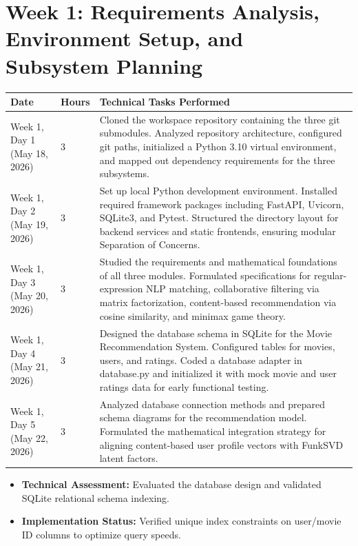 \documentclass[11pt,a4paper]{article}
\begin{document}
\section*{Week 1: Requirements Analysis, Environment Setup, and Subsystem Planning}
\begin{longtable}{L{2.8cm} C{1.2cm} L{10.5cm}}
    \toprule
    \textbf{Date} & \textbf{Hours} & \textbf{Technical Tasks Performed} \\
    \midrule
    \endhead
    \bottomrule
    \endfoot
    \bottomrule
    \endlastfoot
    Week 1, Day 1 \newline (May 18, 2026) & 3 & Cloned the workspace repository containing the three git submodules. Analyzed repository architecture, configured git paths, initialized a Python 3.10 virtual environment, and mapped out dependency requirements for the three subsystems. \\
    \addlinespace
    Week 1, Day 2 \newline (May 19, 2026) & 3 & Set up local Python development environment. Installed required framework packages including FastAPI, Uvicorn, SQLite3, and Pytest. Structured the directory layout for backend services and static frontends, ensuring modular Separation of Concerns. \\
    \addlinespace
    Week 1, Day 3 \newline (May 20, 2026) & 3 & Studied the requirements and mathematical foundations of all three modules. Formulated specifications for regular-expression NLP matching, collaborative filtering via matrix factorization, content-based recommendation via cosine similarity, and minimax game theory. \\
    \addlinespace
    Week 1, Day 4 \newline (May 21, 2026) & 3 & Designed the database schema in SQLite for the Movie Recommendation System. Configured tables for movies, users, and ratings. Coded a database adapter in database.py and initialized it with mock movie and user ratings data for early functional testing. \\
    \addlinespace
    Week 1, Day 5 \newline (May 22, 2026) & 3 & Analyzed database connection methods and prepared schema diagrams for the recommendation model. Formulated the mathematical integration strategy for aligning content-based user profile vectors with FunkSVD latent factors. \\
\end{longtable}

\begin{tcolorbox}[colback=gray!5!white,colframe=gray!60!black,title=Weekly Review (Week 1)]
    \begin{itemize}
        \item \textbf{Technical Assessment:} Evaluated the database design and validated SQLite relational schema indexing.
        \item \textbf{Implementation Status:} Verified unique index constraints on user/movie ID columns to optimize query speeds.
    \end{itemize}
\end{tcolorbox}
\end{document}
